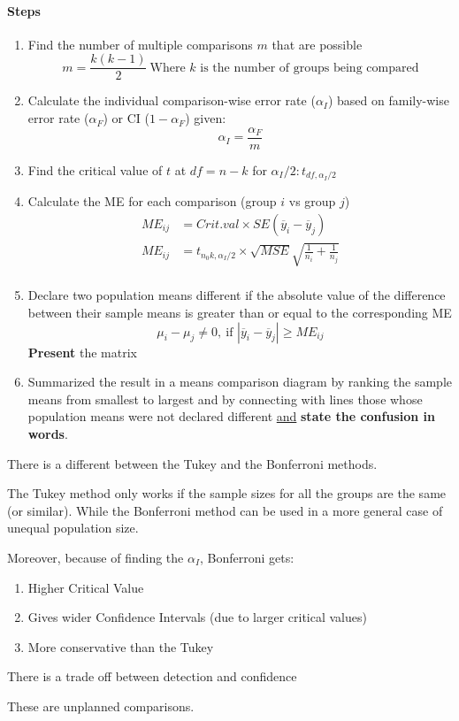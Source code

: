 \documentclass[../STAT-252-Notes.tex]{subfiles}
\begin{document}
\paragraph{Steps}
\begin{enumerate}
  \item Find the number of multiple comparisons $m$ that are possible
    \[ 
      m = \frac{k(k-1)}{2}\ \text{Where $k$ is the number of groups being compared} 
    \] 
  \item Calculate the individual comparison-wise error rate ($\alpha_I$) based on family-wise error rate ($\alpha_F$) or CI ($1-\alpha_F$) given:
    \[ 
    \alpha_I = \frac{\alpha_F}{m} 
    \] 
   \item Find the critical value of $t$ at $df = n-k$ for $\alpha_I / 2: t_{df, \alpha_I / 2}$ 
   \item Calculate the ME for each comparison (group $i$ vs group $j$)
     \begin{align*}
       ME_{ij} &=  Crit.val \times SE(\overline{y}_i - \overline{y}_j) \\
       ME_{ij} &= t_{n_0k, \alpha_I / 2} \times \sqrt{MSE} \sqrt{\frac{1}{n_i}+\frac{1}{n_j}}  \\
     \end{align*}
  \item Declare two population means different if the absolute value of the difference between their sample means is greater than or equal to the corresponding ME
  \[ 
  \mu_i - \mu_j \neq 0,\ \text{if $|\overline{y}_i - \overline{y}_j |\ge ME_{ij}$} 
  \] 
  \textbf{Present} the matrix 
  \item Summarized the result in a means comparison diagram by ranking the sample means from smallest to largest and by connecting with lines those whose population means were not declared different \underline{and} \textbf{state the confusion in words}.
\end{enumerate}


\begin{Note}
  There is a different between the Tukey and the Bonferroni methods. 

  The Tukey method only works if the sample sizes for all the groups are the same (or similar). 
  While the Bonferroni method can be used in a more general case of unequal population size.
  
  Moreover, because of finding the $\alpha_I$, Bonferroni gets:
  \begin{enumerate}
    \item Higher Critical Value
    \item Gives wider Confidence Intervals (due to larger critical values)
    \item More conservative than the Tukey
  \end{enumerate}
  There is a trade off between detection and confidence

  These are unplanned comparisons.
\end{Note}
\end{document}
